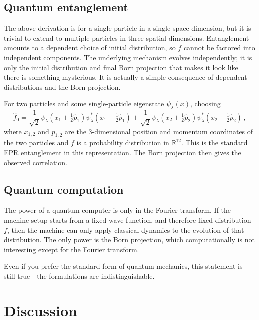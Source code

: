 \documentclass[prb,preprint]{revtex4-1}
\begin{document}
\subsection{Quantum entanglement}

The above derivation is for a single particle in a single space dimension, but it is trivial
to extend to multiple particles in three spatial dimensions.  Entanglement amounts to a
dependent choice of initial distribution, so $f$ cannot be factored into independent components.
The underlying mechanism evolves independently; it is only the initial distribution and final
Born projection that makes it look like there is something mysterious.  It is actually a simple
consequence of dependent distributions and the Born projection.

For two particles and some single-particle eigenstate $\psi_\lambda(x)$, choosing
\begin{equation}\label{eq:entanglement}
\hat{f}_0=\frac{1}{\sqrt{2}}\psi_\lambda\!\left(x_1+\tfrac{1}{2}\hat{p}_1\right)\psi^*_\lambda\!\left(x_1-\tfrac{1}{2} \hat{p}_1\right) +\frac{1}{\sqrt{2}}\psi_\lambda\!\left(x_2+\tfrac{1}{2}\hat{p}_2\right)\psi^*_\lambda\!\left(x_2-\tfrac{1}{2} \hat{p}_2\right) \,,
\end{equation}
where $x_{1,2}$ and $p_{1,2}$ are the 3-dimensional position and momentum coordinates of the two
particles and $f$ is a probability distribution in $\mathbb{R}^{12}$.  This is the standard EPR entanglement
in this representation.  The Born projection then gives the observed correlation.

\subsection{Quantum computation}

The power of a quantum computer is only in the Fourier transform.  If the machine setup
starts from a fixed wave function, and therefore fixed distribution $f$, then the machine can
only apply classical dynamics to the evolution of that distribution.  The only power is the
Born projection, which computationally is not interesting except for the Fourier transform.

Even if you prefer the standard form of quantum mechanics, this statement is still true---the
formulations are indistinguishable.


\section{Discussion}
\end{document}
